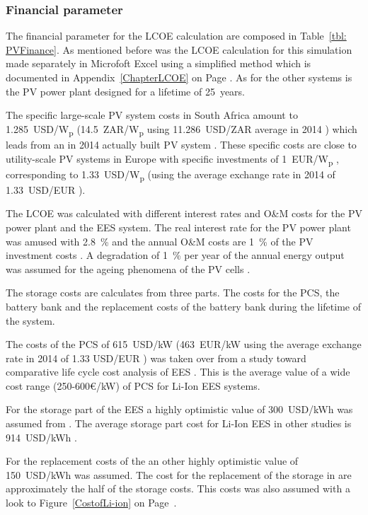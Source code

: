 \subsubsection{Financial parameter}
The financial parameter for the LCOE calculation are composed in Table~\ref{tbl: PVFinance}. As mentioned before was the LCOE calculation for this simulation made separately in Microfoft Excel using a simplified method which is documented in Appendix~\ref{ChapterLCOE} on Page \pageref{ChapterLCOE}. As for the other systems is the PV power plant designed for a lifetime of 25~years. 

The specific large-scale PV system costs in South Africa  amount to 1.285~USD/W\textsubscript{p} (14.5~ZAR/W\textsubscript{p} using 11.286~USD/ZAR average in 2014 \cite{IRS2015}) which leads from an in 2014 actually built PV system \cite{Terblanche2015}. These specific costs are close to utility-scale PV systems in Europe with specific investments of 1~EUR/W\textsubscript{p} \cite{FraunhoferISE2013}, corresponding to 1.33~USD/W\textsubscript{p} (using the average exchange rate in 2014 of 1.33~USD/EUR  \cite{StatistaGmbH2015}).

The LCOE was calculated with different interest rates and O\&M costs for the PV power plant and the EES system. The real interest rate for the PV power plant was amused with 2.8~\% \cite{FraunhoferISE2013} and the annual O\&M costs are 1~\%  of the PV investment costs \cite{IEA2014a}. A degradation of 1~\% per year of the annual energy output was assumed for the ageing phenomena of the PV cells \cite{Tidball2010}.

The storage costs are calculates from three  parts. The costs for the PCS, the battery bank and the replacement costs of the battery bank during the lifetime of the system.

The costs of the PCS of 615~USD/kW (463~EUR/kW using the average exchange rate in 2014 of 1.33 USD/EUR \cite{StatistaGmbH2015}) was taken over from a study toward comparative life cycle cost analysis of EES \cite{Zakeri2015}. This is the average value of  a wide cost range (250-600€/kW) of PCS for Li-Ion EES systems.

For the storage part of the EES a highly optimistic value of 300~USD/kWh was assumed from \cite{Nykvist2015}. The average storage part cost for Li-Ion EES in other studies is 914~USD/kWh \cite{Zakeri2015}.

For the replacement costs of the an other highly optimistic value of 150~USD/kWh was assumed. The cost for the replacement of the storage in \cite{Zakeri2015} are approximately the half of the storage costs. This costs was also assumed with a look to Figure~\ref{CostofLi-ion} on Page~\pageref{CostofLi-ion}.

